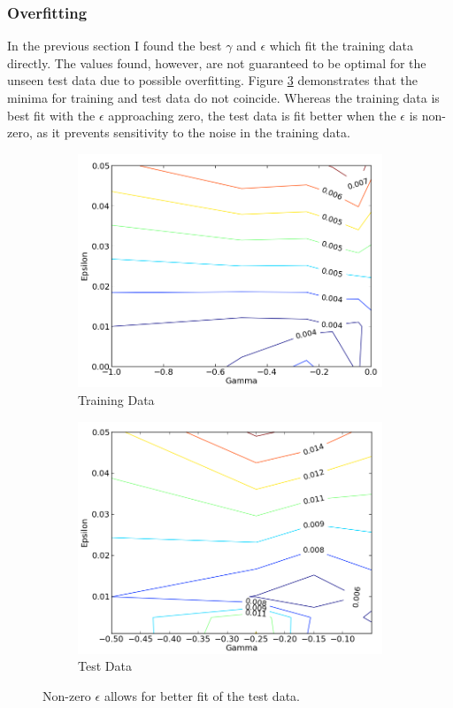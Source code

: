 \documentclass[12pt,a4paper,notitlepage,twoside]{scrbook}
\begin{document}
\subsubsection*{Overfitting}
In the previous section I found the best $\gamma$ and $\epsilon$ which fit the training
data directly.
The values found, however, are not guaranteed to be optimal for the unseen test data due
to possible overfitting. 
Figure \ref{overfit} demonstrates that the minima for training and
test data do not coincide. Whereas the training data is best fit with the $\epsilon$
approaching zero, the test data is fit better when the $\epsilon$ is
non-zero, as it prevents sensitivity to the noise in the training
data. 

\begin{figure}[h]
\centering
\begin{subfigure}[b]{.49\textwidth}
  \centering
  \includegraphics[width=\linewidth]{figs/fine_tune_tr_zoom.png}
  \caption{Training Data}
  \label{coarse}
\end{subfigure}
\begin{subfigure}[b]{.49\textwidth}
  \centering
  \includegraphics[width=\linewidth]{figs/fine_tune_ts.png}
  \caption{Test Data}
  \label{fine}
\end{subfigure}
\caption{Non-zero $\epsilon$ allows for better fit of the test data.\label{overfit}}
\end{figure}
\end{document}
